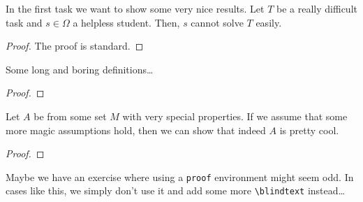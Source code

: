 \documentclass[english]{../uni-sheet}
\begin{document}
\maketitle

\ex In the first task we want to show some very nice results.
\subex Let $T$ be a really difficult task and $s\in\Omega$ a helpless student. Then, $s$ cannot solve $T$ easily.
\begin{proof}
The proof is standard.
\end{proof}

\subex Some long and boring definitions\dots
\begin{proof}
\blindtext
\end{proof}

Let $A$ be from some set $M$ with very special properties. If we assume that some more magic assumptions hold, then we can show that indeed $A$ is pretty cool.
\begin{proof}
\blindtext
\end{proof}

Maybe we have an exercise where using a \verb+proof+ environment might seem odd. In cases like this, we simply don't use it and add some more \verb+\blindtext+ instead\dots

\blindtext
\end{document}
